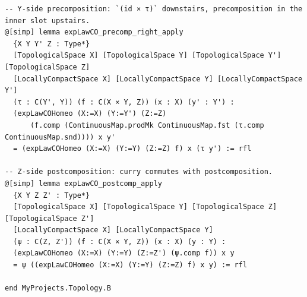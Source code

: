 \documentclass[12pt]{article}
\theoremstyle{definition}
\begin{document}
\begin{lstlisting}
-- Y-side precomposition: `(id × τ)` downstairs, precomposition in the inner slot upstairs.
@[simp] lemma expLawCO_precomp_right_apply
  {X Y Y' Z : Type*}
  [TopologicalSpace X] [TopologicalSpace Y] [TopologicalSpace Y'] [TopologicalSpace Z]
  [LocallyCompactSpace X] [LocallyCompactSpace Y] [LocallyCompactSpace Y']
  (τ : C(Y', Y)) (f : C(X × Y, Z)) (x : X) (y' : Y') :
  (expLawCOHomeo (X:=X) (Y:=Y') (Z:=Z)
      (f.comp (ContinuousMap.prodMk ContinuousMap.fst (τ.comp ContinuousMap.snd)))) x y'
  = (expLawCOHomeo (X:=X) (Y:=Y) (Z:=Z) f) x (τ y') := rfl

-- Z-side postcomposition: curry commutes with postcomposition.
@[simp] lemma expLawCO_postcomp_apply
  {X Y Z Z' : Type*}
  [TopologicalSpace X] [TopologicalSpace Y] [TopologicalSpace Z] [TopologicalSpace Z']
  [LocallyCompactSpace X] [LocallyCompactSpace Y]
  (ψ : C(Z, Z')) (f : C(X × Y, Z)) (x : X) (y : Y) :
  (expLawCOHomeo (X:=X) (Y:=Y) (Z:=Z') (ψ.comp f)) x y
  = ψ ((expLawCOHomeo (X:=X) (Y:=Y) (Z:=Z) f) x y) := rfl

end MyProjects.Topology.B

\end{lstlisting}
\end{document}
